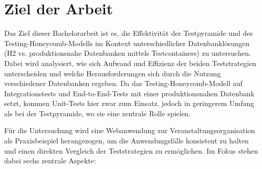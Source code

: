 \chapter{Ziel der Arbeit}

Das Ziel dieser Bachelorarbeit ist es, die Effektivität der Testpyramide und des Testing-Honeycomb-Modells im Kontext unterschiedlicher Datenbanklösungen (H2 vs. produktionsnahe Datenbanken mittels Testcontainers) zu untersuchen. Dabei wird analysiert, wie sich Aufwand und Effizienz der beiden Teststrategien unterscheiden und welche Herausforderungen sich durch die Nutzung verschiedener Datenbanken ergeben. Da das Testing-Honeycomb-Modell auf Integrationstests und End-to-End-Tests mit einer produktionsnahen Datenbank setzt, kommen Unit-Tests hier zwar zum Einsatz, jedoch in geringerem Umfang als bei der Testpyramide, wo sie eine zentrale Rolle spielen.

Für die Untersuchung wird eine Webanwendung zur Veranstaltungsorganisation als Praxisbeispiel herangezogen, um die Anwendungsfälle konsistent zu halten und einen direkten Vergleich der Teststrategien zu ermöglichen. Im Fokus stehen dabei sechs zentrale Aspekte:

